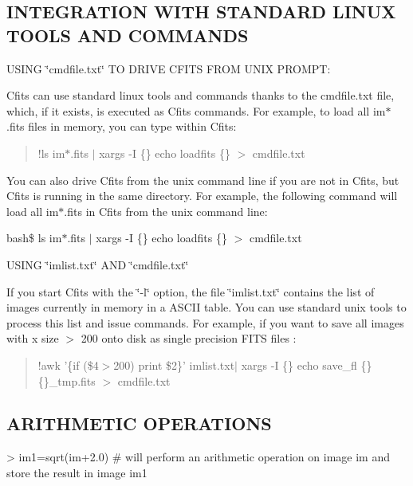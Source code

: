 \subsection*{I\+N\+T\+E\+G\+R\+A\+T\+I\+O\+N W\+I\+T\+H S\+T\+A\+N\+D\+A\+R\+D L\+I\+N\+U\+X T\+O\+O\+L\+S A\+N\+D C\+O\+M\+M\+A\+N\+D\+S}

U\+S\+I\+N\+G \char`\"{}cmdfile.\+txt\char`\"{} T\+O D\+R\+I\+V\+E C\+F\+I\+T\+S F\+R\+O\+M U\+N\+I\+X P\+R\+O\+M\+P\+T\+:

Cfits can use standard linux tools and commands thanks to the cmdfile.\+txt file, which, if it exists, is executed as Cfits commands. For example, to load all im$\ast$.fits files in memory, you can type within Cfits\+:

\begin{quote}
!ls im$\ast$.fits $\vert$ xargs -\/\+I \{\} echo loadfits \{\} $>$ cmdfile.\+txt \end{quote}


You can also drive Cfits from the unix command line if you are not in Cfits, but Cfits is running in the same directory. For example, the following command will load all im$\ast$.fits in Cfits from the unix command line\+:

bash\$ ls im$\ast$.fits $\vert$ xargs -\/\+I \{\} echo loadfits \{\} $>$ cmdfile.\+txt

U\+S\+I\+N\+G \char`\"{}imlist.\+txt\char`\"{} A\+N\+D \char`\"{}cmdfile.\+txt\char`\"{}

If you start Cfits with the \char`\"{}-\/l\char`\"{} option, the file \char`\"{}imlist.\+txt\char`\"{} contains the list of images currently in memory in a A\+S\+C\+I\+I table. You can use standard unix tools to process this list and issue commands. For example, if you want to save all images with x size $>$ 200 onto disk as single precision F\+I\+T\+S files \+:

\begin{quote}
!awk '\{if (\$4$>$200) print \$2\}' imlist.\+txt$\vert$ xargs -\/\+I \{\} echo save\+\_\+fl \{\} \{\}\+\_\+tmp.\+fits $>$ cmdfile.\+txt \end{quote}


\subsection*{A\+R\+I\+T\+H\+M\+E\+T\+I\+C O\+P\+E\+R\+A\+T\+I\+O\+N\+S}

\begin{DoxyVerb}> im1=sqrt(im+2.0)          
    # will perform an arithmetic operation on image im and store the result in image im1
\end{DoxyVerb}
 